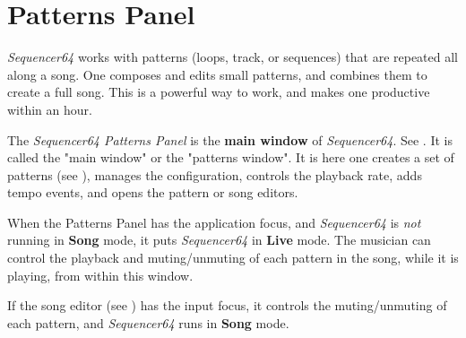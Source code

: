 %
%
%

\section{Patterns Panel}
\label{sec:seq64_patterns_panel}

   \textsl{Sequencer64} works with patterns (loops, track, or
   sequences) that are repeated all along a song.  One composes and edits small
   patterns, and combines them to create a full song.  This is a powerful way
   to work, and makes one productive within an hour.

   The \textsl{Sequencer64 Patterns Panel} is the
   \textbf{main window} of \textsl{Sequencer64}.
   See .
   It is called the "main window" or the "patterns window".
   It is here one creates a set of patterns
   (see ),
   manages the configuration, controls the playback rate, adds tempo events,
   and opens the pattern or song editors.

   When the Patterns Panel has the application focus,
   and \textsl{Sequencer64} is \textsl{not} running in \textbf{Song} mode,
   it puts \textsl{Sequencer64} in \textbf{Live} mode.
   The musician can
   control the playback and muting/unmuting of each pattern in
   the song, while it is playing, from within this window.

   If the song editor (see )
   has the input focus, it controls the muting/unmuting of
   each pattern, and \textsl{Sequencer64} runs in \textbf{Song} mode.
%

